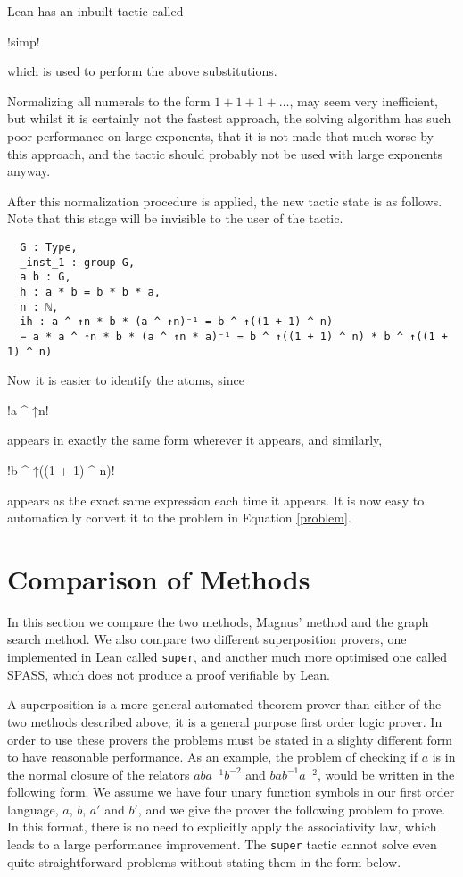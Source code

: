 \documentclass[12pt]{article} %
\theoremstyle{definition}
\theoremstyle{definition}
\theoremstyle{definition}
\theoremstyle{definition}
\begin{document}
Lean has an inbuilt tactic called \begin{lstinline} !simp! \end{lstinline} which is used
to perform the above substitutions.

Normalizing all numerals to the form $1 + 1 + 1 + \dots$, may seem very inefficient,
but whilst it is certainly not the fastest approach, the
solving algorithm has such poor performance on large exponents, that it is not made
that much worse by this approach, and the tactic should probably not be used with
large exponents anyway.

After this normalization procedure is applied, the new tactic state is as follows.
Note that this stage will be invisible to the user of the tactic.

\begin{lstlisting}
  G : Type,
  _inst_1 : group G,
  a b : G,
  h : a * b = b * b * a,
  n : ℕ,
  ih : a ^ ↑n * b * (a ^ ↑n)⁻¹ = b ^ ↑((1 + 1) ^ n)
  ⊢ a * a ^ ↑n * b * (a ^ ↑n * a)⁻¹ = b ^ ↑((1 + 1) ^ n) * b ^ ↑((1 + 1) ^ n)
\end{lstlisting}

Now it is easier to identify the atoms, since \begin{lstinline} !a ^ ↑n! \end{lstinline}
appears in exactly the same form wherever it appears, and similarly, \begin{lstinline} !b ^ ↑((1 + 1) ^ n)!
\end{lstinline} appears as the exact same expression each time it appears. It is
now easy to automatically convert it to the problem in Equation \ref{problem}.
\section{Comparison of Methods}

In this section we compare the two methods,
Magnus' method and the graph search
method. We also compare two different superposition provers,
one implemented in Lean called \lstinline{super}, and another much more optimised
one called SPASS, which does not produce a proof verifiable by Lean.

A superposition is a more general automated theorem prover than either of the two methods
described above; it is a general purpose first order logic prover. In order to use these provers
the problems must be stated in a slighty different form to have reasonable performance.
As an example, the problem of checking if $a$ is in the normal closure of the
relators $aba^{-1}b^{-2}$ and $bab^{-1}a^{-2}$, would be written in the following form.
We assume we have four unary function symbols in our first order language,
$a$, $b$, $a'$ and $b'$, and we give the prover the following problem to prove. In
this format, there is no need to explicitly apply the associativity law, which
leads to a large performance improvement. The \lstinline{super} tactic cannot solve
even quite straightforward problems without stating them in the form below.
\end{document}
